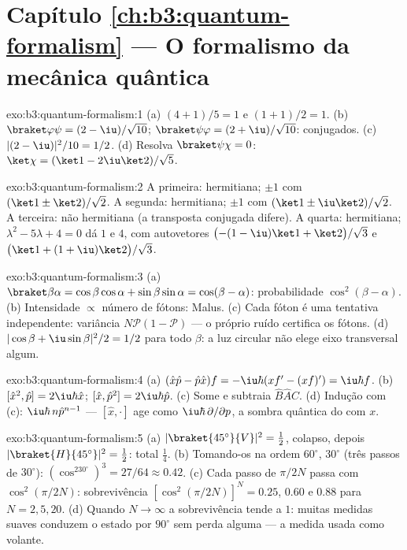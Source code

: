 \section*{Capítulo \ref{ch:b3:quantum-formalism} --- O formalismo da mecânica quântica}

\begin{solution}{exo:b3:quantum-formalism:1}
(a) $(4 + 1)/5 = 1$ e $(1 + 1)/2 = 1$. (b) $\braket\varphi\psi =
(2 - \iu)/\sqrt{10}$; $\braket\psi\varphi = (2 + \iu)/\sqrt{10}$:
conjugados. (c) $|(2 - \iu)|^2/10 = 1/2$. (d) Resolva
$\braket\psi\chi = 0$: $\ket\chi = (\ket1 - 2\iu\ket2)/\sqrt5$.
\end{solution}

\begin{solution}{exo:b3:quantum-formalism:2}
A primeira: hermitiana; $\pm1$ com $(\ket1 \pm \ket2)/\sqrt2$. A
segunda: hermitiana; $\pm1$ com $(\ket1 \pm \iu\ket2)/\sqrt2$. A
terceira: não hermitiana (a transposta conjugada difere). A quarta:
hermitiana; $\lambda^2 - 5\lambda + 4 = 0$ dá $1$ e $4$, com
autovetores $\big({-(1 - \iu)}\ket1 + \ket2\big)/\sqrt3$ e $\big(\ket1 +
(1 + \iu)\ket2\big)/\sqrt3$.
\end{solution}

\begin{solution}{exo:b3:quantum-formalism:3}
(a) $\braket\beta\alpha = \cos\beta\cos\alpha + \sin\beta\sin\alpha
= \cos(\beta - \alpha)$: probabilidade $\cos^2(\beta - \alpha)$. (b)
Intensidade $\propto$ número de fótons: Malus. (c) Cada fóton é uma
tentativa independente: variância $N\mathcal P(1 - \mathcal P)$ --- o
próprio ruído certifica os fótons. (d) $|\cos\beta + \iu\sin\beta|^2/2
= 1/2$ para todo $\beta$: a luz circular não elege eixo transversal
algum.
\end{solution}

\begin{solution}{exo:b3:quantum-formalism:4}
(a) $(\hat x\hat p - \hat p\hat x)f = -\iu\hbar(xf' - (xf)') =
\iu\hbar f$. (b) $[\hat x^2, \hat p] = 2\iu\hbar\hat x$; $[\hat x,
\hat p^2] = 2\iu\hbar\hat p$. (c) Some e subtraia $\hat B\hat A
\hat C$. (d) Indução com (c): $\iu\hbar\,n\hat p^{n-1}$ ---
$[\hat x, \cdot]$ age como $\iu\hbar\,\partial/\partial p$, a sombra
quântica do  com $x$.
\end{solution}

\begin{solution}{exo:b3:quantum-formalism:5}
(a) $|\braket{45^\circ}{V}|^2 = \tfrac12$, colapso, depois
$|\braket{H}{45^\circ}|^2 = \tfrac12$: total $\tfrac14$. (b) Tomando-os
na ordem $60^\circ$, $30^\circ$ (três passos de $30^\circ$):
$(\cos^230^\circ)^3 = 27/64 \approx 0.42$. (c) Cada passo de
$\pi/2N$ passa com $\cos^2(\pi/2N)$: sobrevivência $[\cos^2(\pi/2N)]^N
= 0.25$, $0.60$ e $0.88$ para $N = 2, 5, 20$. (d) Quando $N \to \infty$
a sobrevivência tende a $1$: muitas medidas suaves conduzem o estado
por $90^\circ$ sem perda alguma --- a medida usada como volante.
\end{solution}

